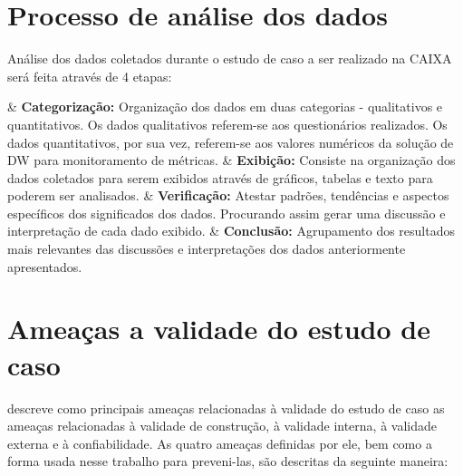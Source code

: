 \section{Processo de análise dos dados}
\label{sec:analise} 

Análise dos dados coletados durante o estudo de caso a ser realizado na CAIXA será feita através de 4 etapas:

\begin{easylist}[itemize]	
	
	& \textbf{Categorização: } Organização dos dados em duas categorias - qualitativos e quantitativos. Os dados qualitativos referem-se aos questionários realizados. Os dados quantitativos, por sua vez, referem-se aos valores numéricos da solução de DW para monitoramento de métricas. 
	& \textbf{Exibição: } Consiste na organização dos dados coletados para serem exibidos através de gráficos, tabelas e texto para poderem ser analisados. 
	& \textbf{Verificação: } Atestar padrões, tendências e aspectos específicos dos significados dos dados. Procurando assim gerar uma discussão e interpretação de cada dado exibido.
	& \textbf{Conclusão: } Agrupamento dos resultados mais relevantes das discussões e interpretações dos dados anteriormente apresentados.
	
	\end{easylist}	


\section{Ameaças a validade do estudo de caso}
\label{sec:validade} 

 descreve como principais ameaças relacionadas à validade do estudo de caso as ameaças relacionadas à validade de construção, à validade interna, à validade externa e à confiabilidade. As quatro ameaças definidas por ele, bem como a forma usada nesse trabalho para preveni-las, são descritas da seguinte maneira: 

